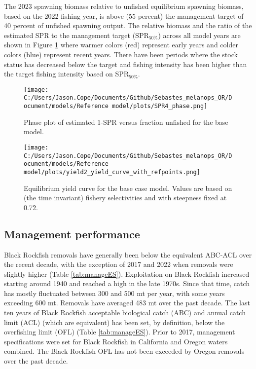 \documentclass[11pt,
  english,
  letterpaper,
]{article}
\begin{document}
The 2023 spawning biomass relative to unfished equilibrium spawning biomass, based on the 2022 fishing year, is above (55 percent) the management target of 40 percent of unfished spawning output. The relative biomass and the ratio of the estimated SPR to the management target (\(\text{SPR}_{50\%}\)) across all model years are shown in Figure \ref{fig:es-phase} where warmer colors (red) represent early years and colder colors (blue) represent recent years. There have been periods where the stock status has decreased below the target and fishing intensity has been higher than the target fishing intensity based on \(\text{SPR}_{50\%}\).

\begin{figure}
\centering
\texttt{[image: C:/Users/Jason.Cope/Documents/Github/Sebastes\_melanops\_OR/Document/models/Reference model/plots/SPR4\_phase.png]}
\caption{Phase plot of estimated 1-SPR versus fraction unfished for the base model.\label{fig:es-phase}}
\end{figure}

\begin{figure}
\centering
\texttt{[image: C:/Users/Jason.Cope/Documents/Github/Sebastes\_melanops\_OR/Document/models/Reference model/plots/yield2\_yield\_curve\_with\_refpoints.png]}
\caption{Equilibrium yield curve for the base case model. Values are based on (the time invariant) fishery selectivities and with steepness fixed at 0.72.\label{fig:es-yield}}
\end{figure}



\clearpage

\hypertarget{management-performance}{%
\subsection*{Management performance}\label{management-performance}}

Black Rockfish removals have generally been below the equivalent ABC-ACL over the recent decade, with the exception of 2017 and 2022 when removals were slightly higher (Table \ref{tab:manageES}). Exploitation on Black Rockfish increased starting around 1940 and reached a high in the late 1970s. Since that time, catch has mostly fluctuated between 300 and 500 mt per year, with some years exceeding 600 mt. Removals have averaged 483 mt over the past decade. The last ten years of Black Rockfish acceptable biological catch (ABC) and annual catch limit (ACL) (which are equivalent) has been set, by definition, below the overfishing limit (OFL) (Table \ref{tab:manageES}). Prior to 2017, management specifications were set for Black Rockfish in California and Oregon waters combined. The Black Rockfish OFL has not been exceeded by Oregon removals over the past decade.
\end{document}
